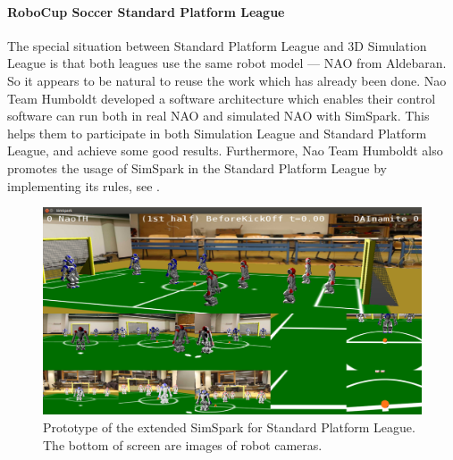 \documentclass{llncs}
\begin{document}
\label{s:application}

\paragraph{RoboCup Soccer Standard Platform League}

The special situation between Standard Platform League and 3D Simulation League is that both leagues use the same robot model — NAO from Aldebaran.
So it appears to be natural to reuse the work which has already been done.
Nao Team Humboldt developed a software architecture\cite{SCPR2010} which enables their control software can run both in real NAO and simulated NAO with SimSpark. This helps them to participate in both Simulation League and Standard Platform League, and achieve some good results.
Furthermore, Nao Team Humboldt also promotes the usage of SimSpark in the Standard Platform League by implementing its rules, see .

\begin{figure}
  \centering
  \includegraphics[width = 0.6\columnwidth]{simspark-spl}
  \caption{Prototype of the extended SimSpark for Standard Platform League.
    The bottom of screen are images of robot cameras.}
  \label{f:simspark-spl}
\end{figure}
\end{document}
